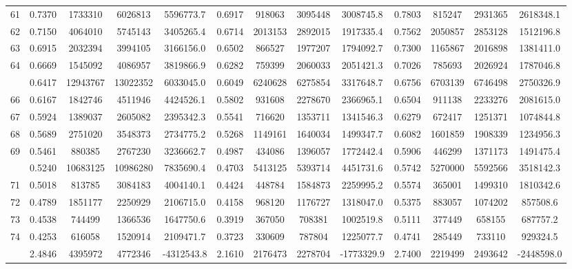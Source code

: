 \documentclass[
  12pt,
]{article}
\begin{document}
\begin{longtable}[t]{lcccccccccccc}
61 & 0.7370 & 1733310 & 6026813 & 5596773.7 & 0.6917 & 918063 & 3095448 & 3008745.8 & 0.7803 & 815247 & 2931365 & 2618348.1\\
62 & 0.7150 & 4064010 & 5745143 & 3405265.4 & 0.6714 & 2013153 & 2892015 & 1917335.4 & 0.7562 & 2050857 & 2853128 & 1512196.8\\
63 & 0.6915 & 2032394 & 3994105 & 3166156.0 & 0.6502 & 866527 & 1977207 & 1794092.7 & 0.7300 & 1165867 & 2016898 & 1381411.0\\
64 & 0.6669 & 1545092 & 4086957 & 3819866.9 & 0.6282 & 759399 & 2060033 & 2051421.3 & 0.7026 & 785693 & 2026924 & 1787046.8\\
\addlinespace
65 & 0.6417 & 12943767 & 13022352 & 6033045.0 & 0.6049 & 6240628 & 6275854 & 3317648.7 & 0.6756 & 6703139 & 6746498 & 2750326.9\\
66 & 0.6167 & 1842746 & 4511946 & 4424526.1 & 0.5802 & 931608 & 2278670 & 2366965.1 & 0.6504 & 911138 & 2233276 & 2081615.0\\
67 & 0.5924 & 1389037 & 2605082 & 2395342.3 & 0.5541 & 716620 & 1353711 & 1341546.3 & 0.6279 & 672417 & 1251371 & 1074844.8\\
68 & 0.5689 & 2751020 & 3548373 & 2734775.2 & 0.5268 & 1149161 & 1640034 & 1499347.7 & 0.6082 & 1601859 & 1908339 & 1234956.3\\
69 & 0.5461 & 880385 & 2767230 & 3236662.7 & 0.4987 & 434086 & 1396057 & 1772442.4 & 0.5906 & 446299 & 1371173 & 1491475.4\\
\addlinespace
70 & 0.5240 & 10683125 & 10986280 & 7835690.4 & 0.4703 & 5413125 & 5393714 & 4451731.6 & 0.5742 & 5270000 & 5592566 & 3518142.3\\
71 & 0.5018 & 813785 & 3084183 & 4004140.1 & 0.4424 & 448784 & 1584873 & 2259995.2 & 0.5574 & 365001 & 1499310 & 1810342.6\\
72 & 0.4789 & 1851177 & 2250929 & 2106715.0 & 0.4158 & 968120 & 1176727 & 1318047.0 & 0.5375 & 883057 & 1074202 & 857508.6\\
73 & 0.4538 & 744499 & 1366536 & 1647750.6 & 0.3919 & 367050 & 708381 & 1002519.8 & 0.5111 & 377449 & 658155 & 687757.2\\
74 & 0.4253 & 616058 & 1520914 & 2109471.7 & 0.3723 & 330609 & 787804 & 1225077.7 & 0.4741 & 285449 & 733110 & 929324.5\\
\addlinespace
75 & 2.4846 & 4395972 & 4772346 & -4312543.8 & 2.1610 & 2176473 & 2278704 & -1773329.9 & 2.7400 & 2219499 & 2493642 & -2448598.0\\*
\end{longtable}
\endgroup{}
\end{document}

